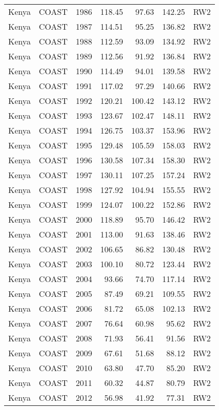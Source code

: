 \begin{longtable}{lllrrrl}
  Kenya & COAST & 1986 & 118.45 & 97.63 & 142.25 & RW2 \\ 
  Kenya & COAST & 1987 & 114.51 & 95.25 & 136.82 & RW2 \\ 
  Kenya & COAST & 1988 & 112.59 & 93.09 & 134.92 & RW2 \\ 
  Kenya & COAST & 1989 & 112.56 & 91.92 & 136.84 & RW2 \\ 
  Kenya & COAST & 1990 & 114.49 & 94.01 & 139.58 & RW2 \\ 
  Kenya & COAST & 1991 & 117.02 & 97.29 & 140.66 & RW2 \\ 
  Kenya & COAST & 1992 & 120.21 & 100.42 & 143.12 & RW2 \\ 
  Kenya & COAST & 1993 & 123.67 & 102.47 & 148.11 & RW2 \\ 
  Kenya & COAST & 1994 & 126.75 & 103.37 & 153.96 & RW2 \\ 
  Kenya & COAST & 1995 & 129.48 & 105.59 & 158.03 & RW2 \\ 
  Kenya & COAST & 1996 & 130.58 & 107.34 & 158.30 & RW2 \\ 
  Kenya & COAST & 1997 & 130.11 & 107.25 & 157.24 & RW2 \\ 
  Kenya & COAST & 1998 & 127.92 & 104.94 & 155.55 & RW2 \\ 
  Kenya & COAST & 1999 & 124.07 & 100.22 & 152.86 & RW2 \\ 
  Kenya & COAST & 2000 & 118.89 & 95.70 & 146.42 & RW2 \\ 
  Kenya & COAST & 2001 & 113.00 & 91.63 & 138.46 & RW2 \\ 
  Kenya & COAST & 2002 & 106.65 & 86.82 & 130.48 & RW2 \\ 
  Kenya & COAST & 2003 & 100.10 & 80.72 & 123.44 & RW2 \\ 
  Kenya & COAST & 2004 & 93.66 & 74.70 & 117.14 & RW2 \\ 
  Kenya & COAST & 2005 & 87.49 & 69.21 & 109.55 & RW2 \\ 
  Kenya & COAST & 2006 & 81.72 & 65.08 & 102.13 & RW2 \\ 
  Kenya & COAST & 2007 & 76.64 & 60.98 & 95.62 & RW2 \\ 
  Kenya & COAST & 2008 & 71.93 & 56.41 & 91.56 & RW2 \\ 
  Kenya & COAST & 2009 & 67.61 & 51.68 & 88.12 & RW2 \\ 
  Kenya & COAST & 2010 & 63.80 & 47.70 & 85.20 & RW2 \\ 
  Kenya & COAST & 2011 & 60.32 & 44.87 & 80.79 & RW2 \\ 
  Kenya & COAST & 2012 & 56.98 & 41.92 & 77.31 & RW2 \\ 

\end{longtable}
